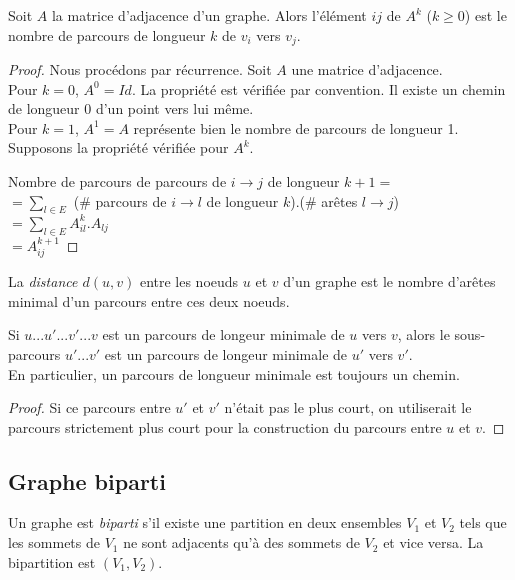 \begin{mytheo} 
  Soit $A$ la matrice d'adjacence d'un graphe. Alors l'élément $ij$ de $A^k$ ($k \geq 0$) est le nombre de parcours de longueur $k$ de $v_i$ vers $v_j$.
  \begin{proof}
    Nous procédons par récurrence. Soit $A$ une matrice d'adjacence.\\
    Pour $k=0$, $A^{0}=Id$. La propriété est vérifiée par convention. Il existe un chemin de longueur 0 d'un point vers lui même. \\
    Pour $k=1$, $A^{1}=A$ représente bien le nombre de parcours de longueur 1. \\
    Supposons la propriété vérifiée pour $A^{k}$.

    Nombre de parcours de parcours de $i \to j$ de longueur $k+1 =$\\
    $= \sum_{l \in E}$ (\# parcours de $i \to l$ de longueur $k$)$.$(\# arêtes $l \to j$)\\
    $= \sum_{l \in E} A_{il}^{k}.A_{lj}$\\
    $= A_{ij}^{k+1}$
  \end{proof}
\end{mytheo}

\begin{mydef}
  La \emph{distance $d(u, v)$} entre les noeuds $u$ et $v$ d'un graphe est le nombre d'arêtes minimal d'un parcours entre ces deux noeuds.
\end{mydef}

\begin{mylem}
  Si $u...u'...v'...v$ est un parcours de longeur minimale de $u$ vers $v$, alors le sous-parcours $u'...v'$ est un parcours de longeur minimale de $u'$ vers $v'$.\\
  En particulier, un parcours de longueur minimale est toujours un chemin.
  \begin{proof}
    Si ce parcours entre $u'$ et $v'$ n'était pas le plus court, on utiliserait le parcours strictement plus court pour la construction du parcours entre $u$ et $v$.
  \end{proof}
\end{mylem}

\subsection{Graphe biparti}
\begin{mydef}
  Un graphe est \emph{biparti}  s'il existe une partition en deux ensembles $V_1$ et $V_2$ tels que les sommets de $V_1$ ne sont adjacents qu'à des sommets de $V_2$ et vice versa. La bipartition est $(V_1, V_2)$.
\end{mydef}

